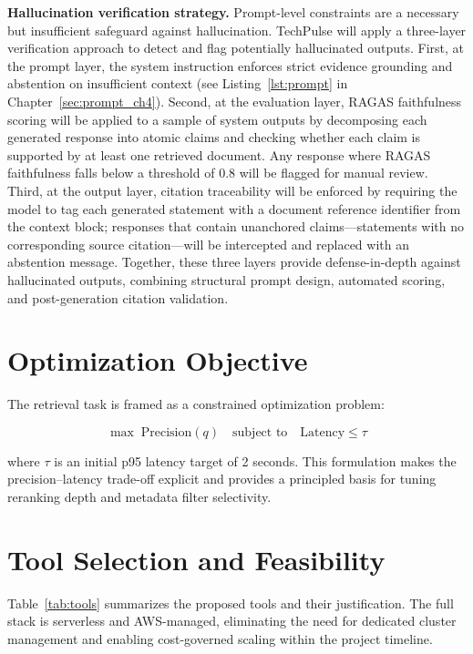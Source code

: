 \documentclass[12pt,a4paper]{report}
\begin{document}
\textbf{Hallucination verification strategy.} Prompt-level constraints are a necessary but insufficient safeguard against hallucination. TechPulse will apply a three-layer verification approach to detect and flag potentially hallucinated outputs. First, at the prompt layer, the system instruction enforces strict evidence grounding and abstention on insufficient context (see Listing~\ref{lst:prompt} in Chapter~\ref{sec:prompt_ch4}). Second, at the evaluation layer, RAGAS faithfulness scoring will be applied to a sample of system outputs by decomposing each generated response into atomic claims and checking whether each claim is supported by at least one retrieved document. Any response where RAGAS faithfulness falls below a threshold of 0.8 will be flagged for manual review. Third, at the output layer, citation traceability will be enforced by requiring the model to tag each generated statement with a document reference identifier from the context block; responses that contain unanchored claims—statements with no corresponding source citation—will be intercepted and replaced with an abstention message. Together, these three layers provide defense-in-depth against hallucinated outputs, combining structural prompt design, automated scoring, and post-generation citation validation.

\section{Optimization Objective}
\label{sec:optimization}

The retrieval task is framed as a constrained optimization problem:

\begin{equation}
  \max \; \text{Precision}(q) \quad \text{subject to} \quad \text{Latency} \leq \tau
  \label{eq:opt}
\end{equation}

where $\tau$ is an initial p95 latency target of 2 seconds. This formulation makes the precision--latency trade-off explicit and provides a principled basis for tuning reranking depth and metadata filter selectivity.

\section{Tool Selection and Feasibility}
\label{sec:tools}

Table~\ref{tab:tools} summarizes the proposed tools and their justification. The full stack is serverless and AWS-managed, eliminating the need for dedicated cluster management and enabling cost-governed scaling within the project timeline.
\end{document}
